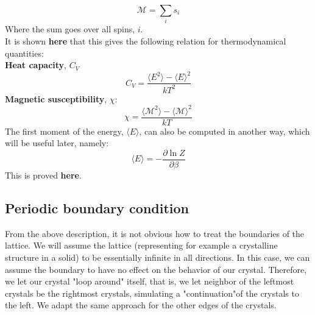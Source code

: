 \documentclass[a4paper, 10pt]{article}
\begin{document}
\begin{equation}
\mathcal{M}=\sum_i s_i
\end{equation}
Where the sum goes over all spins, $i$.\\
\linebreak
It is shown \textbf{here} that this  gives the following relation for thermodynamical quantities:\\
\textbf{Heat capacity}, $C_V$\\
\begin{equation}\label{eq:heat_capacity}
C_V=\frac{\langle E^2\rangle - \langle E \rangle^2}{kT^2}
\end{equation}
\textbf{Magnetic susceptibility}, $\chi$:
\begin{equation}\label{eq:magnetic_susp}
\chi=\frac{\langle \mathcal{M}^2\rangle - \langle \mathcal{M} \rangle^2}{kT}
\end{equation}
The first moment of the energy, $\langle E \rangle$, can also be computed in another way, which will be useful later, namely:
\begin{equation}
\langle E \rangle = -\frac{\partial \ln Z}{\partial \beta}
\end{equation}
This is proved \textbf{here}.
\subsection{Periodic boundary condition}
From the above description, it is not obvious how to treat the boundaries of the lattice. We will assume the  lattice (representing for example a crystalline structure in a solid) to be essentially infinite in all directions. In this case, we can assume the boundary to have no effect on the behavior of our crystal. Therefore, we let our crystal "loop around" itself, that is, we let neighbor of the leftmost crystals be the rightmost crystals, simulating a "continuation"of the crystals to the left. We adapt the same approach for the other edges of the crystals.
\end{document}
